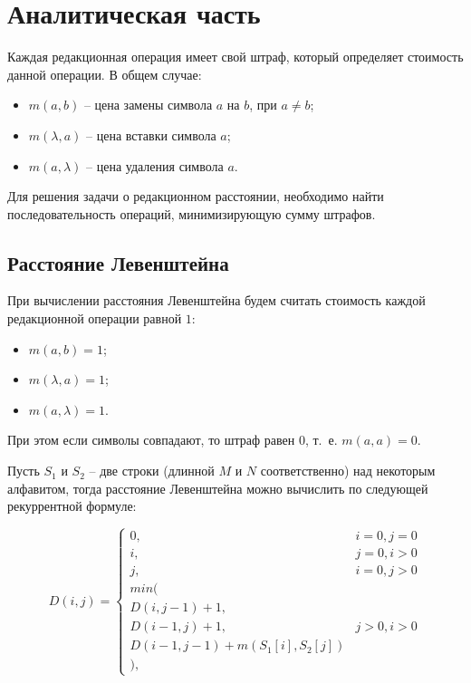 \chapter{Аналитическая часть}

Каждая редакционная операция имеет свой штраф, который определяет стоимость данной операции. В общем случае:
\begin{itemize}
	\item $ m(a, b) $ -- цена замены символа $ a $ на $ b $, при $ a \ne b $;
	\item $ m(\lambda, a) $ -- цена вставки символа $ a $;
	\item $ m(a, \lambda) $ -- цена удаления символа $ a $.
\end{itemize}

Для решения задачи о редакционном расстоянии, необходимо найти последовательность операций, минимизирующую сумму штрафов. 

\section{Расстояние Левенштейна}

При вычислении расстояния Левенштейна будем считать стоимость каждой редакционной операции равной $ 1 $:
\begin{itemize}
	\item $ m(a, b) = 1 $;
	\item $ m(\lambda, a) = 1 $;
	\item $ m(a, \lambda) = 1 $.
\end{itemize}

При этом если символы совпадают, то штраф равен $0$, т.~е. $ m(a, a) = 0 $.

Пусть $S_1$ и $S_2$ -- две строки (длинной $M$ и $N$ соответственно) над некоторым алфавитом, тогда расстояние Левенштейна можно вычислить по следующей рекуррентной формуле:

\begin{equation}
	\label{eq:L}
	D(i,j) = \left\{ \begin{array}{ll}
		0, & \textrm{$i = 0, j = 0$}\\
		i, & \textrm{$j = 0, i > 0$}\\
		j, & \textrm{$i = 0, j > 0$}\\
		min(\\
		D(i,j-1)+1,\\
		D(i-1, j) +1, &\textrm{$j>0, i>0$}\\
		D(i-1, j-1) + m(S_{1}[i], S_{2}[j])\\
		),
	\end{array} \right.
\end{equation}


